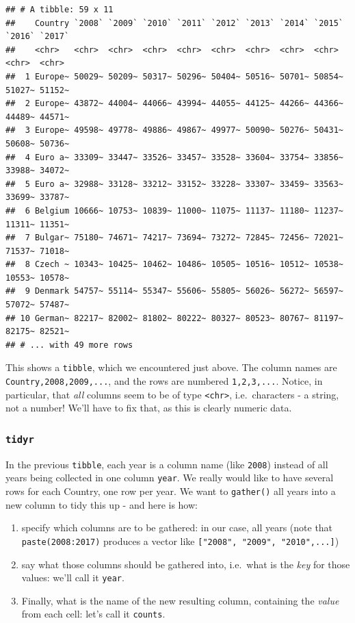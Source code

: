 \documentclass[]{book}
\providecommand{\tightlist}{%
  \setlength{\itemsep}{0pt}\setlength{\parskip}{0pt}}
\begin{document}
\begin{verbatim}
## # A tibble: 59 x 11
##    Country `2008` `2009` `2010` `2011` `2012` `2013` `2014` `2015` `2016` `2017`
##    <chr>   <chr>  <chr>  <chr>  <chr>  <chr>  <chr>  <chr>  <chr>  <chr>  <chr> 
##  1 Europe~ 50029~ 50209~ 50317~ 50296~ 50404~ 50516~ 50701~ 50854~ 51027~ 51152~
##  2 Europe~ 43872~ 44004~ 44066~ 43994~ 44055~ 44125~ 44266~ 44366~ 44489~ 44571~
##  3 Europe~ 49598~ 49778~ 49886~ 49867~ 49977~ 50090~ 50276~ 50431~ 50608~ 50736~
##  4 Euro a~ 33309~ 33447~ 33526~ 33457~ 33528~ 33604~ 33754~ 33856~ 33988~ 34072~
##  5 Euro a~ 32988~ 33128~ 33212~ 33152~ 33228~ 33307~ 33459~ 33563~ 33699~ 33787~
##  6 Belgium 10666~ 10753~ 10839~ 11000~ 11075~ 11137~ 11180~ 11237~ 11311~ 11351~
##  7 Bulgar~ 75180~ 74671~ 74217~ 73694~ 73272~ 72845~ 72456~ 72021~ 71537~ 71018~
##  8 Czech ~ 10343~ 10425~ 10462~ 10486~ 10505~ 10516~ 10512~ 10538~ 10553~ 10578~
##  9 Denmark 54757~ 55114~ 55347~ 55606~ 55805~ 56026~ 56272~ 56597~ 57072~ 57487~
## 10 German~ 82217~ 82002~ 81802~ 80222~ 80327~ 80523~ 80767~ 81197~ 82175~ 82521~
## # ... with 49 more rows
\end{verbatim}

This shows a \texttt{tibble}, which we encountered just above. The
column names are \texttt{Country,2008,2009,...}, and the rows are
numbered \texttt{1,2,3,...}. Notice, in particular, that \emph{all}
columns seem to be of type \texttt{\textless{}chr\textgreater{}},
i.e.~characters - a string, not a number! We'll have to fix that, as
this is clearly numeric data.

\subsubsection{\texorpdfstring{\texttt{tidyr}}{tidyr}}\label{tidyr}

In the previous \texttt{tibble}, each year is a column name (like
\texttt{2008}) instead of all years being collected in one column
\texttt{year}. We really would like to have several rows for each
Country, one row per year. We want to \texttt{gather()} all years into a
new column to tidy this up - and here is how:

\begin{enumerate}
\def\labelenumi{\arabic{enumi}.}
\tightlist
\item
  specify which columns are to be gathered: in our case, all years (note
  that \texttt{paste(2008:2017)} produces a vector like
  \texttt{{[}"2008",\ "2009",\ "2010",...{]}})
\item
  say what those columns should be gathered into, i.e.~what is the
  \emph{key} for those values: we'll call it \texttt{year}.
\item
  Finally, what is the name of the new resulting column, containing the
  \emph{value} from each cell: let's call it \texttt{counts}.
\end{enumerate}
\end{document}
